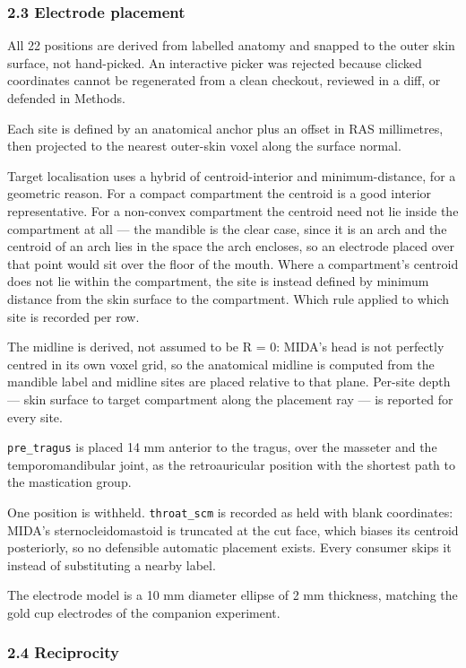 \documentclass[
  11pt,
  a4paper,
]{article}
\begin{document}
\subsubsection{2.3 Electrode placement}\label{electrode-placement}

All 22 positions are derived from labelled anatomy and snapped to the outer skin
surface, not hand-picked. An interactive picker was rejected because clicked
coordinates cannot be regenerated from a clean checkout, reviewed in a diff, or
defended in Methods.

Each site is defined by an anatomical anchor plus an offset in RAS millimetres,
then projected to the nearest outer-skin voxel along the surface normal.

Target localisation uses a hybrid of centroid-interior and minimum-distance, for
a geometric reason. For a compact compartment the centroid is a good interior
representative. For a non-convex compartment the centroid need not lie inside
the compartment at all --- the mandible is the clear case, since it is an arch and
the centroid of an arch lies in the space the arch encloses, so an electrode
placed over that point would sit over the floor of the mouth. Where a
compartment's centroid does not lie within the compartment, the site is instead
defined by minimum distance from the skin surface to the compartment. Which rule
applied to which site is recorded per row.

The midline is derived, not assumed to be R = 0: MIDA's head is not perfectly
centred in its own voxel grid, so the anatomical midline is computed from the
mandible label and midline sites are placed relative to that plane. Per-site
depth --- skin surface to target compartment along the placement ray --- is reported
for every site.

\texttt{pre\_tragus} is placed 14 mm anterior to the tragus, over the masseter and the
temporomandibular joint, as the retroauricular position with the shortest path
to the mastication group.

One position is withheld. \texttt{throat\_scm} is recorded as held with blank
coordinates: MIDA's sternocleidomastoid is truncated at the cut face, which
biases its centroid posteriorly, so no defensible automatic placement exists.
Every consumer skips it instead of substituting a nearby label.

The electrode model is a 10 mm diameter ellipse of 2 mm thickness, matching the
gold cup electrodes of the companion experiment.

\subsubsection{2.4 Reciprocity}\label{reciprocity}
\end{document}
